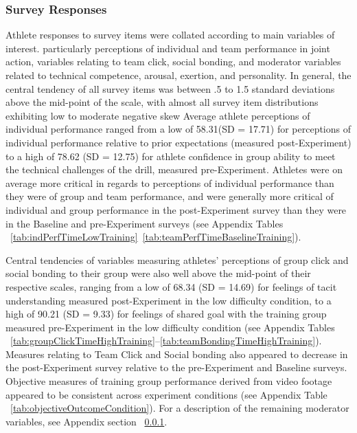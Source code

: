 \subsubsection{Survey Responses}
Athlete responses to survey items were collated according to main variables of interest. particularly perceptions of individual and team performance in joint action, variables relating to team click, social bonding, and moderator variables related to technical competence, arousal, exertion, and personality. In general, the central tendency of all survey items was between .5 to 1.5 standard deviations above the mid-point of the scale, with almost all survey item distributions exhibiting low to moderate negative skew %
Average athlete perceptions of individual performance ranged from a low of 58.31(SD = 17.71) for perceptions of individual performance relative to prior expectations (measured post-Experiment) to a high of 78.62 (SD = 12.75) for athlete confidence in group ability to meet the technical challenges of the drill, measured pre-Experiment.  Athletes were on average more critical in regards to perceptions of individual performance than they were of group and team performance, and were generally more critical of individual and group performance in the post-Experiment survey than they were in the Baseline and pre-Experiment surveys (see Appendix Tables ~\ref{tab:indPerfTimeLowTraining}\nobreakdash~\ref{tab:teamPerfTimeBaselineTraining}).

Central tendencies of variables measuring athletes' perceptions of group click and social bonding to their group were also well above the mid-point of their respective scales, ranging from a low of 68.34 (SD = 14.69) for feelings of tacit understanding measured post-Experiment in the low difficulty condition, to a high of 90.21 (SD = 9.33) for feelings of shared goal with the training group measured pre-Experiment in the low difficulty condition (see Appendix Tables ~\ref{tab:groupClickTimeHighTraining}\nobreakdash--\ref{tab:teamBondingTimeHighTraining}).
Measures relating to Team Click and Social bonding also appeared to decrease in the post-Experiment survey relative to the pre-Experiment and Baseline surveys.  Objective measures of training group performance derived from video footage appeared to be consistent across experiment conditions (see Appendix Table ~\ref{tab:objectiveOutcomeCondition}).
For a description of the remaining moderator variables, see Appendix section ~\ref{}.



